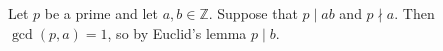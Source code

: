 Let $p$ be a prime and let $a, b \in \mathbb{Z}$.
Suppose that $p \mid ab$ and $p \nmid a$.
Then $\gcd(p, a) = 1$, so by Euclid's lemma $p \mid b$.